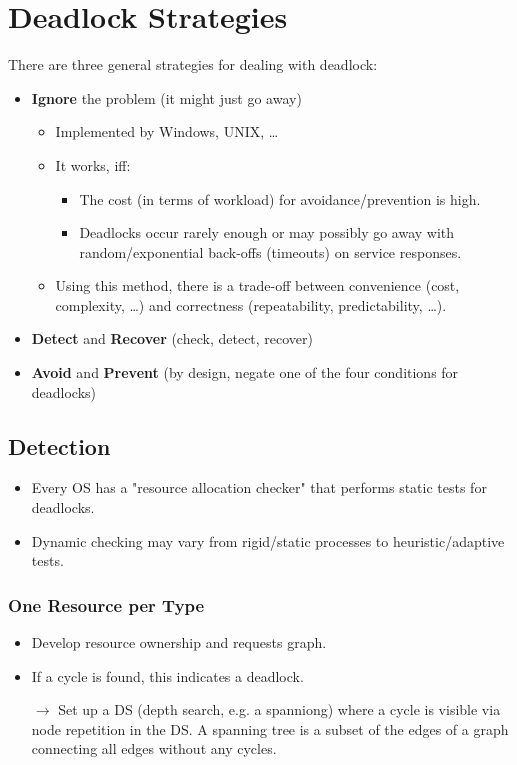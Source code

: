     \section{Deadlock Strategies}
        There are three general strategies for dealing with deadlock:
        \begin{itemize}
        	\item \textbf{Ignore} the problem (it might just go away)
            	\begin{itemize}
            		\item Implemented by Windows, UNIX, \dots
            		\item It works, iff:
	            		\begin{itemize}
	            			\item The cost (in terms of workload) for avoidance/prevention is high.
	            			\item Deadlocks occur rarely enough or may possibly go away with random/exponential back-offs (timeouts) on service responses.
	            		\end{itemize}
            		\item Using this method, there is a trade-off between convenience (cost, complexity, \dots) and correctness (repeatability, predictability, \dots).
            	\end{itemize}
        	\item \textbf{Detect} and \textbf{Recover} (check, detect, recover)
        	\item \textbf{Avoid} and \textbf{Prevent} (by design, negate one of the four conditions for deadlocks)
        \end{itemize}

        \subsection{Detection}
            \begin{itemize}
            	\item Every OS has a "resource allocation checker" that performs static tests for deadlocks.
            	\item Dynamic checking may vary from rigid/static processes to heuristic/adaptive tests.
            \end{itemize}

            \subsubsection{One Resource per Type}
                \begin{itemize}
                	\item Develop resource ownership and requests graph.
                	\item If a cycle is found, this indicates a deadlock.
                	\item[\(\rightarrow\)] Set up a DS (depth search, e.g. a spanniong) where a cycle is visible via node repetition in the DS. A spanning tree is a subset of the edges of a graph connecting all edges without any cycles.
                \end{itemize}

